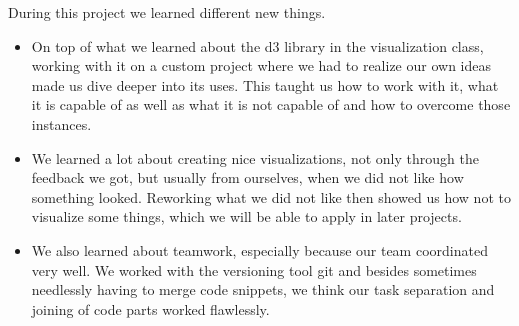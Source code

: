 \documentclass{vgtc} %
\begin{document}
During this project we learned different new things.

\begin{itemize}
\item On top of what we learned about the d3 library in the visualization class, working with it on a custom project where we had to realize our own ideas made us dive deeper into its uses. This taught us how to work with it, what it is capable of as well as what it is not capable of and how to overcome those instances.
\item We learned a lot about creating nice visualizations, not only through the feedback we got, but usually from ourselves, when we did not like how something looked. Reworking what we did not like then showed us how not to visualize some things, which we will be able to apply in later projects.
\item We also learned about teamwork, especially because our team coordinated very well. We worked with the versioning tool git and besides sometimes needlessly having to merge code snippets, we think our task separation and joining of code parts worked flawlessly.
\end{itemize}
\end{document}
